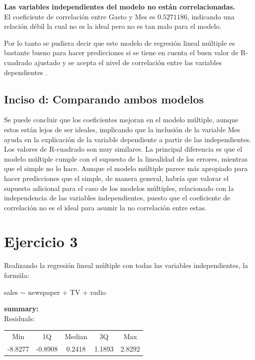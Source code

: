 \documentclass[12pt,a4paper]{article}
\begin{document}
\newpage
	
	\textbf{Las variables independientes del modelo no están correlacionadas.}\\
	
	El coeficiente de correlación entre Gasto y Mes es $0.5271186$, indicando una relación débil la cual no es la ideal pero no es tan malo para el modelo.
	
	Por lo tanto se pudiera decir que este modelo de regresión lineal múltiple es bastante bueno para hacer predicciones si se tiene en cuenta el buen valor de R-cuadrado ajustado y se acepta  el nivel de correlación entre las variables dependientes .
	
	 \subsection{Inciso d: Comparando ambos modelos }
	 Se puede concluir que los coeficientes mejoran en el modelo múltiple, aunque estos están lejos de ser ideales, implicando que la inclusión de la variable Mes ayuda en la explicación de la variable dependiente a partir de las independientes. Los valores de R-cuadrado son muy similares. La principal diferencia es que el modelo múltiple cumple con el supuesto de la linealidad de los errores, mientras que el simple no lo hace. Aunque el modelo múltiple parece más apropiado para hacer predicciones que el simple, de manera general, habría que valorar el supuesto adicional para el caso de los modelos múltiples, relacionado con la independencia de las variables independientes, puesto que el coeficiente de correlación no es el ideal para asumir la no correlación entre estas.   
	
	\section{Ejercicio 3}
	Realizando la regresión lineal múltiple con todas las variables independientes,
	la formúla:
	\begin{center}
		sales $\sim$ newspaper + TV + radio 
	\end{center}
	
	{\bf summary: }\\
	
	Residuals:\\
	
	\begin{tabular}{ccccc}
		Min&     1Q& Median& 3Q&    Max\\
		-8.8277& -0.8908&  0.2418&  1.1893&  2.8292 
	\end{tabular}\\ 
	
\end{document}
